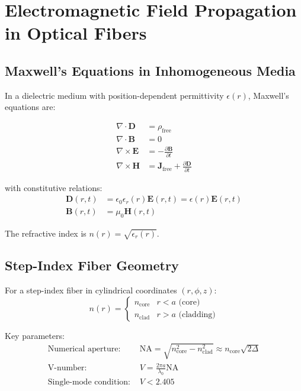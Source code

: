 \documentclass[12pt,a4paper]{article}
\begin{document}
\section{Electromagnetic Field Propagation in Optical Fibers}

\subsection{Maxwell's Equations in Inhomogeneous Media}

In a dielectric medium with position-dependent permittivity $\epsilon(r)$, Maxwell's equations are:

\begin{align}
\nabla \cdot \mathbf{D} &= \rho_{\text{free}} \\
\nabla \cdot \mathbf{B} &= 0 \\
\nabla \times \mathbf{E} &= -\frac{\partial \mathbf{B}}{\partial t} \\
\nabla \times \mathbf{H} &= \mathbf{J}_{\text{free}} + \frac{\partial \mathbf{D}}{\partial t}
\end{align}

with constitutive relations:
\begin{align}
\mathbf{D}(r,t) &= \epsilon_0 \epsilon_r(r) \mathbf{E}(r,t) = \epsilon(r)\mathbf{E}(r,t) \\
\mathbf{B}(r,t) &= \mu_0 \mathbf{H}(r,t)
\end{align}

The refractive index is $n(r) = \sqrt{\epsilon_r(r)}$.

\subsection{Step-Index Fiber Geometry}

For a step-index fiber in cylindrical coordinates $(r, \phi, z)$:
\begin{equation}
n(r) = \begin{cases}
n_{\text{core}} & r < a \text{ (core)} \\
n_{\text{clad}} & r > a \text{ (cladding)}
\end{cases}
\end{equation}

Key parameters:
\begin{align}
\text{Numerical aperture: } & \text{NA} = \sqrt{n_{\text{core}}^2 - n_{\text{clad}}^2} \approx n_{\text{core}}\sqrt{2\Delta} \\
\text{V-number: } & V = \frac{2\pi a}{\lambda_0}\text{NA} \\
\text{Single-mode condition: } & V < 2.405
\end{align}
\end{document}
